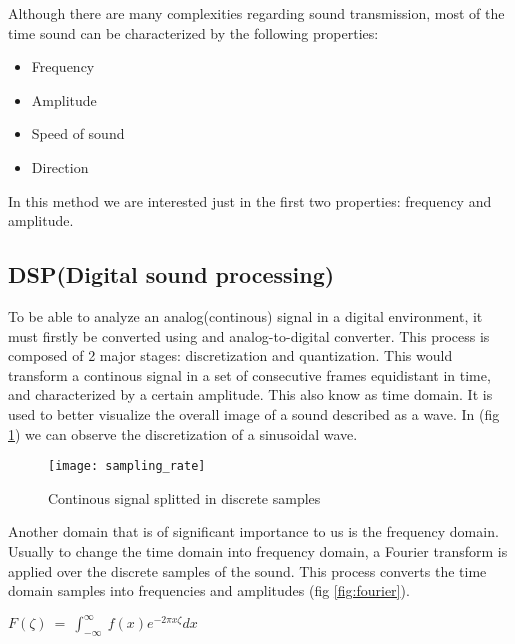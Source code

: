 \documentclass[12pt]{report}
\begin{document}
Although there are many complexities regarding sound transmission, most of the time sound can be characterized by the following properties:
\begin{itemize}
	\item Frequency
	\item Amplitude
	\item Speed of sound
	\item Direction
\end{itemize}
In this method we are interested just in the first two properties: frequency and amplitude.

\subsection{DSP(Digital sound processing)}
To be able to analyze an analog(continous) signal in a digital environment, it must firstly be converted using and analog-to-digital converter. This process is composed of 2 major stages: discretization and quantization. This would transform a continous signal in a set of consecutive frames equidistant in time, and characterized by a certain amplitude. This also know as time domain. It is used to better visualize the overall image of a sound described as a wave. In (fig \ref{fig:samp_rate}) we can observe the discretization of a sinusoidal wave.

\begin{figure}
\centering
\texttt{[image: sampling\_rate]}
\caption{Continous signal splitted in discrete samples}
\label{fig:samp_rate}
\end{figure}

Another domain that is of significant importance to us is the frequency domain. Usually to change the time domain into frequency domain, a Fourier transform is applied over the discrete samples of the sound. This process converts the time domain samples into frequencies and amplitudes (fig \ref{fig:fourier}).

\begin{center}
\begin{math}
F\left(\zeta \right)\:=\:\int _{-\infty }^{\infty }\:f\left(x\right)e^{-2\pi x\zeta }dx
\end{math}
\end{center}
\end{document}
